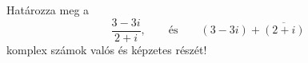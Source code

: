 \documentclass[11pt]{scrartcl}
\begin{document}
Határozza meg a
\[
	\frac{3 - 3i}{2 + i}, \qquad \text{és} \qquad
	(3 - 3i) + \overline{(2 + i)}
\]
komplex számok valós és képzetes részét!
\end{document}
